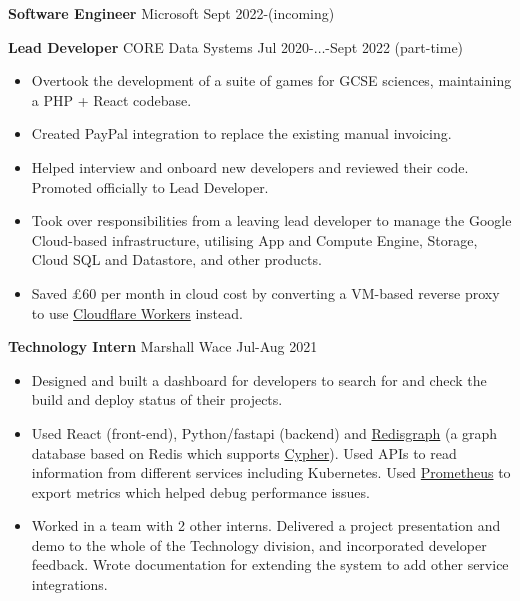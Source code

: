   \begin{itemize}
    {%
      \item \textbf{Software Engineer} \dashdiv{} Microsoft \dashdiv{} Sept 2022-(incoming)
    }

    \item \textbf{Lead Developer} \dashdiv{} CORE Data Systems \dashdiv{} Jul 2020-$\ldots$-Sept 2022 (part-time)

    \begin{itemize}
      \item Overtook the development of a suite of games for GCSE sciences, maintaining a PHP + React codebase.
      \item Created PayPal integration to replace the existing manual invoicing.
      \item Helped interview and onboard new developers and reviewed their code. Promoted officially to Lead Developer.
      \item Took over responsibilities from a leaving lead developer to manage the Google Cloud-based infrastructure, utilising App and Compute Engine, Storage, Cloud SQL and Datastore, and other products.
      \item Saved £60 per month in cloud cost by converting a VM-based reverse proxy to use \href{https://workers.cloudflare.com/}{\color{link}Cloudflare Workers} instead.
    \end{itemize}

    \item \textbf{Technology Intern} \dashdiv{} Marshall Wace \dashdiv{} Jul-Aug 2021

    \begin{itemize}
      \item Designed and built a dashboard for developers to search for and check the build and deploy status of their projects.
      \item Used React (front-end), Python/fastapi (backend) and \href{https://oss.redis.com/redisgraph/}{\color{link}Redisgraph} (a graph database based on Redis which supports \href{https://neo4j.com/developer/cypher/}{\color{link}Cypher}). Used APIs to read information from different services including Kubernetes. Used \href{https://prometheus.io/}{\color{link}Prometheus} to export metrics which helped debug performance issues.
      \item Worked in a team with 2 other interns. Delivered a project presentation and demo to the whole of the Technology division, and incorporated developer feedback. Wrote documentation for extending the system to add other service integrations.
    \end{itemize}

  \end{itemize}

